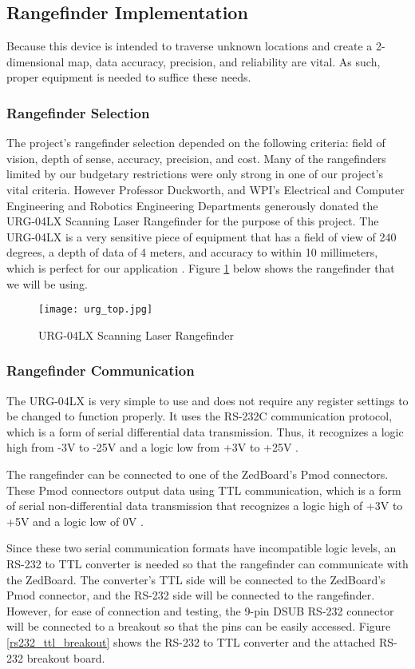 \subsection{Rangefinder Implementation}
Because this device is intended to traverse unknown locations and create a 2-dimensional map, data accuracy, precision, and reliability are vital. As such, proper equipment is needed to suffice these needs. 

\subsubsection{Rangefinder Selection}
The project's rangefinder selection depended on the following criteria: field of vision, depth of sense, accuracy, precision, and cost. Many of the rangefinders limited by our budgetary restrictions were only strong in one of our project's vital criteria. However Professor Duckworth, and WPI's Electrical and Computer Engineering and Robotics Engineering Departments generously donated the URG-04LX Scanning Laser Rangefinder for the purpose of this project. The URG-04LX is a very sensitive piece of equipment that has a field of view of 240 degrees, a depth of data of 4 meters, and accuracy to within 10 millimeters, which is perfect for our application \cite{urg04lx}. Figure \ref{rangefinder_pic} below shows the rangefinder that we will be using.

\begin{figure}[H]
	\centerline{\texttt{[image: urg\_top.jpg]}}
	\caption{URG-04LX Scanning Laser Rangefinder}
	\label{rangefinder_pic}
\end{figure}

\subsubsection{Rangefinder Communication}
The URG-04LX is very simple to use and does not require any register settings to be changed to function properly. It uses the RS-232C communication protocol, which is a form of serial differential data transmission. Thus, it recognizes a logic high from -3V to -25V and a logic low from +3V to +25V \cite{rs232}.
\par
The rangefinder can be connected to one of the ZedBoard's Pmod connectors. These Pmod connectors output data using TTL communication, which is a form of serial non-differential data transmission that recognizes a logic high of +3V to +5V and a logic low of 0V \cite{ttl}. 
\par
Since these two serial communication formats have incompatible logic levels, an RS-232 to TTL converter is needed so that the rangefinder can communicate with the ZedBoard. The converter's TTL side will be connected to the ZedBoard's Pmod connector, and the RS-232 side will be connected to the rangefinder. However, for ease of connection and testing, the 9-pin DSUB RS-232 connector will be connected to a breakout so that the pins can be easily accessed. Figure \ref{rs232_ttl_breakout} shows the RS-232 to TTL converter and the attached RS-232 breakout board.

